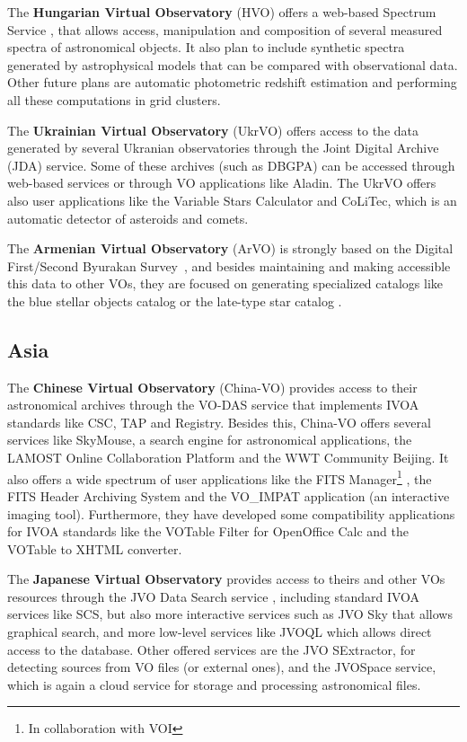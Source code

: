 The \textbf{Hungarian Virtual Observatory} (HVO) offers a web-based Spectrum
Service \cite{Dobos2006},
that allows access, manipulation and composition of
several measured spectra of astronomical objects. It
also plan to include synthetic spectra generated by
astrophysical models that can be compared with observational
data. Other future plans are automatic photometric redshift 
estimation and performing all these computations in grid clusters. 

The \textbf{Ukrainian Virtual Observatory} (UkrVO)
offers access to the data generated by several Ukranian observatories 
through the Joint Digital Archive (JDA) service. Some of these archives 
(such as DBGPA)
can be accessed through web-based services or through VO applications like
Aladin. The UkrVO offers also user applications like the Variable Stars
Calculator and CoLiTec, which is an automatic detector of asteroids and
comets.

The \textbf{Armenian Virtual Observatory} (ArVO) is strongly based on the
Digital First/Second Byurakan Survey~\cite{Massaro2008}, 
and besides maintaining and making accessible this data to other VOs,
they are focused on generating specialized catalogs like the
blue stellar objects catalog or the late-type star catalog 
\cite{Mickaelian2008}.

\subsection{Asia}

The \textbf{Chinese Virtual Observatory} (China-VO) provides
access to their astronomical archives through the VO-DAS service
that implements IVOA standards like CSC, TAP and Registry. 
Besides this, China-VO offers several services like SkyMouse,
a search engine for astronomical applications, the LAMOST Online
Collaboration Platform and the WWT Community Beijing. It also
offers a wide spectrum of user applications like the FITS Manager\footnote{In
collaboration with VOI} \cite{Cui2012}, 
the FITS Header Archiving System and the VO\_IMPAT
application (an interactive imaging tool). Furthermore, they have developed
some compatibility applications for IVOA standards like the
VOTable Filter for OpenOffice Calc and the 
VOTable to XHTML converter. 

The \textbf{Japanese Virtual Observatory} provides access to theirs
and other VOs resources through the JVO Data Search service 
\cite{Shirasaki2009}, 
including standard IVOA services like SCS, but also more interactive services
such as JVO Sky that allows graphical search, and more low-level
services like JVOQL which allows direct access to the database.
Other offered services are the JVO SExtractor, for detecting sources
from VO files (or external ones), and the JVOSpace service, which is
again a cloud service for storage and processing astronomical files.


